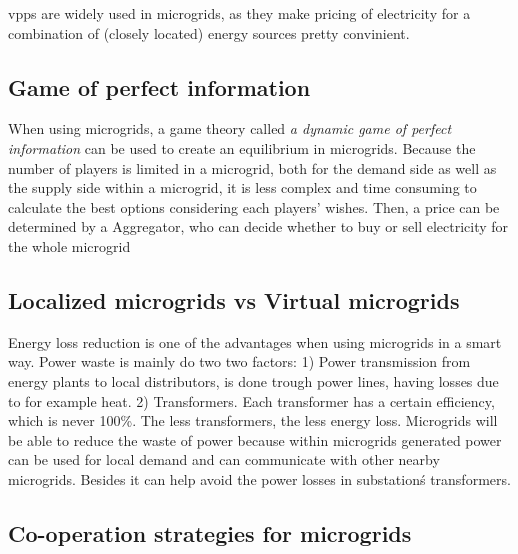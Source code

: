 \glspl{vpp} are widely used in microgrids, as they make pricing of electricity for a combination of (closely located) energy sources pretty convinient. 

\subsection{Game of perfect information}
When using microgrids, a game theory called \emph{a dynamic game of perfect information}  can be used to create an equilibrium in microgrids. Because the number of players is limited in a microgrid, both for the demand side as well as the supply side within a microgrid, it is less complex and time consuming to calculate the best options considering each players' wishes. Then, a price can be determined by a Aggregator, who can decide whether to buy or sell electricity for the whole microgrid \cite{MicrogridModellingPetrosAristidou}\linebreak \indent

\subsection{Localized microgrids vs Virtual microgrids}
Energy loss reduction is one of the advantages when using microgrids in a smart way. Power waste is mainly do two two factors\cite{EnergyLossURL}: 1) Power transmission from energy plants to local distributors, is done trough power lines, having losses due to for example heat. 2) Transformers. Each transformer has a certain efficiency, which is never 100\%. The less transformers, the less energy loss.\linebreak \indent
Microgrids will be able to reduce the waste of power because within microgrids generated power can be used for local demand and can communicate with other nearby microgrids. Besides it can help avoid the power losses in substation\'s transformers\cite{keypaper}.

\subsection{Co-operation strategies for microgrids}



